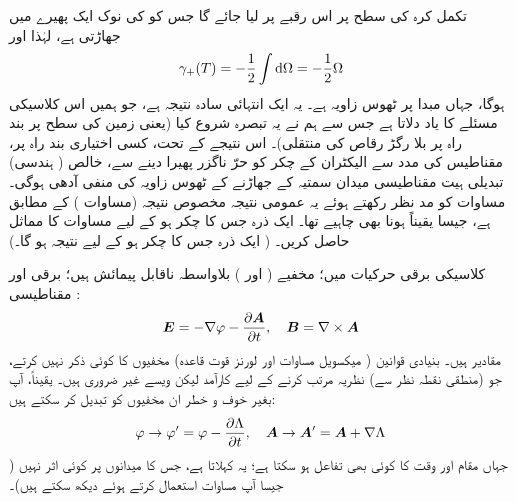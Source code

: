 تکمل کرہ کی سطح پر اس رقبے پر لیا جائے گا جس کو  کی نوک ایک پھیرے میں جھاڑتی ہے، لہٰذا  اور 
\begin{align}\label{مساوات_حر_عمومی_نتیجہ}
\gamma_{+} (T) = - \frac{1}{2} \int \dif \Omega = - \frac{1}{2} \Omega
\end{align}
ہوگا، جہاں مبدا پر ٹھوس زاویہ  ہے۔ یہ ایک انتہائی سادہ نتیجہ ہے، جو ہمیں اس کلاسیکی مسئلے کا یاد دلاتا ہے جس سے ہم نے یہ تبصرہ شروع کیا (یعنی زمین کی سطح پر بند راہ پر بلا رگڑ رقاص کی منتقلی)۔ اس نتیجے کے تحت، کسی اختیاری بند راہ پر، مقناطیس کی مدد سے الیکٹران کے چکر کو حرّ ناگزر پھیرا دینے سے، خالص ( ہندسی) تبدیلی ہیت مقناطیسی میدان سمتیہ کے جھاڑنے کے ٹھوس زاویہ کی منفی آدھی ہوگی۔ مساوات  کو مد نظر رکھتے ہوئے یہ عمومی نتیجہ مخصوص نتیجہ (مساوات ) کے مطابق ہے، جیسا یقیناً ہونا بھی چاہیے تھا۔
ایک ذرہ جس کا چکر  ہو کے لیے مساوات  کا مماثل حاصل کریں۔   ( ایک ذرہ جس کا چکر  ہو کے لیے نتیجہ  ہو گا۔)




کلاسیکی برقی حرکیات میں؛ مخفیے (  اور )  بلاواسطہ ناقابل پیمائش ہیں؛ برقی اور مقناطیسی : 
\begin{align}\label{مساوات_حر_طبیعی_میدان}
{\ensuremath{{\boldsymbol{E}}}} = - \nabla \varphi - \frac{\partial {\ensuremath{{\boldsymbol{A}}}}}{\partial t}, \quad {\ensuremath{{\boldsymbol{B}}}} = \nabla \times {\ensuremath{{\boldsymbol{A}}}}
\end{align}
 مقادیر ہیں۔ بنیادی قوانین ( میکسویل مساوات اور لورنز قوت قاعدہ) مخفیوں کا کوئی ذکر نہیں کرتے، جو (منطقی نقطہ نظر سے) نظریہ مرتب کرنے کے لیے کارآمد لیکن ویسے غیر ضروری ہیں۔ یقیناً، آپ بغیر خوف و خطر ان مخفیوں کو تبدیل کر سکتے ہیں: 
\begin{align}
\varphi \to \varphi' = \varphi - \frac{\partial \Lambda}{\partial t}, \quad {\ensuremath{{\boldsymbol{A}}}} \to {\ensuremath{{\boldsymbol{A}}}}' = {{\boldsymbol{A}}} + \nabla \Lambda
\end{align}
جہاں  مقام اور وقت کا کوئی بھی تفاعل ہو سکتا ہے؛ یہ  کہلاتا ہے، جس کا میدانوں پر کوئی اثر نہیں ( جیسا آپ مساوات  استعمال کرتے ہوئے دیکھ سکتے ہیں)۔ 

